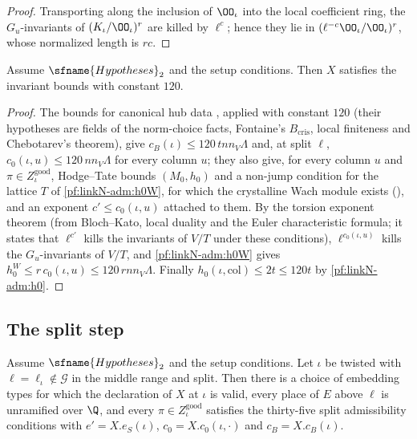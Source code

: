 \begin{proof}
Transporting along the inclusion of $\OO_\iota$ into the local coefficient ring, the $G_u$-invariants of
$(K_\iota/\OO_\iota)^r$ are killed by $\ell^c$; hence they lie in $(\ell^{-c}\OO_\iota/\OO_\iota)^r$, whose normalized length is
$rc$.
\end{proof}

\begin{proposition}\label{pf:linkN-adm:sizes}
Assume $\sfname{Hypotheses}_2$ and the setup conditions. Then $X$ satisfies the invariant bounds with constant $120$.
\end{proposition}

\begin{proof}
The bounds for canonical hub data , applied with constant $120$ (their
hypotheses are fields of the norm-choice facts, Fontaine's $B_{\mathrm{cris}}$, local finiteness and Chebotarev's theorem),
give $c_B(\iota)\le120\,tnn_V\Lambda$ and, at split $\ell$, $c_0(\iota,u)\le120\,nn_V\Lambda$ for every column $u$; they
also give, for every column $u$ and $\pi\in Z^{\mathrm{good}}_\iota$, Hodge--Tate bounds $(M_0,h_0)$ and a non-jump
condition for the lattice $T$ of \cref{pf:linkN-adm:h0W}, for which the crystalline Wach module exists
(), and an exponent $c'\le c_0(\iota,u)$ attached to
them. By the torsion exponent theorem  (from
Bloch--Kato, local duality and the Euler characteristic formula; it states that $\ell^{c'}$ kills the invariants of $V/T$
under these conditions), $\ell^{c_0(\iota,u)}$ kills the $G_u$-invariants of $V/T$, and \cref{pf:linkN-adm:h0W} gives
$h^W_0\le r\,c_0(\iota,u)\le120\,rnn_V\Lambda$. Finally $h_0(\iota,\mathrm{col})\le2t\le120t$ by \cref{pf:linkN-adm:h0}.
\end{proof}

\subsection{The split step}\label{pf:linkN-adm:splitsec}

\begin{proposition}\label{pf:linkN-adm:split}
Assume $\sfname{Hypotheses}_2$ and the setup conditions. Let $\iota$ be twisted with
$\ell=\ell_\iota\notin\mathcal G$ in the middle range and split. Then there is a choice of embedding types for which the
declaration of $X$ at $\iota$ is valid, every place of $E$ above $\ell$ is unramified over $\Q$, and every $\pi\in
Z^{\mathrm{good}}_\iota$ satisfies the thirty-five split admissibility conditions with $e'=X.e_S(\iota)$, $c_0=X.c_0(\iota,
\cdot)$ and $c_B=X.c_B(\iota)$.
\end{proposition}


